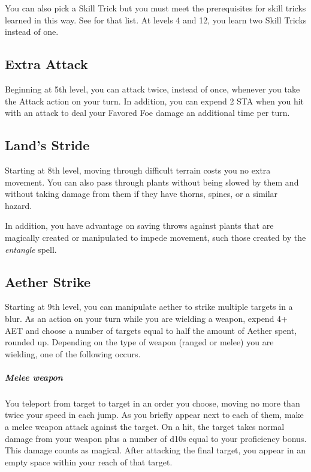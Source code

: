 You can also pick a Skill Trick but you must meet the prerequisites for skill tricks learned in this way. See  for that list. At levels 4 and 12, you learn two Skill Tricks instead of one.

\subsection{Extra Attack}

Beginning at 5th level, you can attack twice, instead of once, whenever you take the Attack action on your turn. In addition, you can expend 2 STA when you hit with an attack to deal your Favored Foe damage an additional time per turn. 

\subsection{Land's Stride}

Starting at 8th level, moving through difficult terrain costs you no extra movement. You can also pass through plants without being slowed by them and without taking damage from them if they have thorns, spines, or a similar hazard.

In addition, you have advantage on saving throws against plants that are magically created or manipulated to impede movement, such those created by the \textit{entangle} spell.

\subsection{Aether Strike}

Starting at 9th level, you can manipulate aether to strike multiple targets in a blur. As an action on your turn while you are wielding a weapon, expend 4+ AET and choose a number of targets equal to half the amount of Aether spent, rounded up. Depending on the type of weapon (ranged or melee) you are wielding, one of the following occurs.

\subparagraph*{Melee weapon} You teleport from target to target in an order you choose, moving no more than twice your speed in each jump. As you briefly appear next to each of them, make a melee weapon attack against the target. On a hit, the target takes normal damage from your weapon plus a number of d10s equal to your proficiency bonus. This damage counts as magical. After attacking the final target, you appear in an empty space within your reach of that target.

